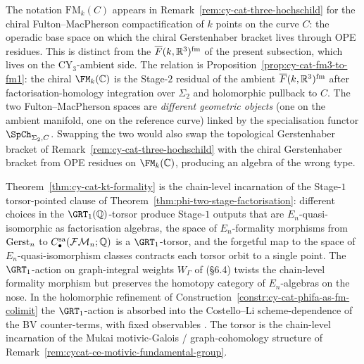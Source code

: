 \begin{remark}
\label{rem:cy-cat-two-fm-meanings}
The notation $\mathrm{FM}_k(C)$ appears in
Remark~\ref{rem:cy-cat-three-hochschild} for the chiral
Fulton--MacPherson compactification of $k$ points on the curve
$C$: the operadic base space on which the chiral Gerstenhaber bracket
lives through OPE residues. This is distinct from the
$\overline{F}(k, \mathbb{R}^3)^{\mathrm{fm}}$ of the present subsection, which
lives on the CY$_3$-ambient side. The relation is
Proposition~\ref{prop:cy-cat-fm3-to-fm1}: the chiral $\FM_k(\mathbb{C})$ is
the Stage-$2$ residual of the ambient $\overline{F}(k, \mathbb{R}^3)^{\mathrm{fm}}$
after factorisation-homology integration over $\Sigma_2$ and
holomorphic pullback to $C$. The two Fulton--MacPherson spaces are
\emph{different geometric objects} (one on the ambient manifold,
one on the reference curve) linked by the specialisation functor
$\SpCh_{\Sigma_2, C}$. Swapping the two would also swap the topological Gerstenhaber bracket of Remark~\ref{rem:cy-cat-three-hochschild} with the chiral Gerstenhaber bracket from OPE residues on $\FM_k(\mathbb{C})$, producing an algebra of the wrong type.
\end{remark}

\begin{remark}
\label{rem:cy-cat-grt1-torsor-stage1}
Theorem~\ref{thm:cy-cat-kt-formality} is the chain-level incarnation
of the Stage-$1$ torsor-pointed clause of
Theorem~\ref{thm:phi-two-stage-factorisation}: different choices in
the $\GRT_1(\mathbb{Q})$-torsor produce Stage-$1$ outputs that are
$E_n$-quasi-isomorphic as factorisation algebras, the space of
$E_n$-formality morphisms from $\mathrm{Gerst}_n$ to
$C^{\mathrm{sa}}_\bullet(\mathcal{FM}_n; \mathbb{Q})$ is a $\GRT_1$-torsor,
and the forgetful map to the space of $E_n$-quasi-isomorphism
classes contracts each torsor orbit to a single point. The
$\GRT_1$-action on graph-integral weights $W_\Gamma$ of
\cite{Kontsevich2003} (\S 6.4) twists the chain-level formality morphism but
preserves the homotopy category of $E_n$-algebras on the nose. In
the holomorphic refinement of
Construction~\ref{constr:cy-cat-phifa-as-fm-colimit} the
$\GRT_1$-action is absorbed into the Costello--Li scheme-dependence
of the BV counter-terms, with fixed observables
\cite{CostelloLi2020}. The torsor is the chain-level incarnation of
the Mukai motivic-Galois / graph-cohomology structure of
Remark~\ref{rem:cycat-ce-motivic-fundamental-group}.
\end{remark}

